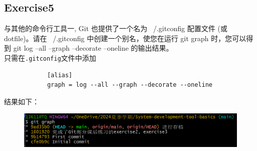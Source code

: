 \documentclass{article}
\begin{document}
        \subsection{Exercise5}
        与其他的命令行工具一, Git 也提供了一个名为 ~/.gitconfig 配置文件 
        (或 dotfile)。请在 ~/.gitconfig 中创建一个别名，使您在运行
         git graph 时，您可以得到 git log --all --graph --decorate --oneline 
         的输出结果。\\
         只需在\verb|.gitconfig|文件中添加
         \begin{verbatim}
            [alias]
            graph = log --all --graph --decorate --oneline
        \end{verbatim}
        结果如下：
        \begin{figure}[H]
            \centering
            \includegraphics[scale=0.8]{7.png}
        \end{figure}
\end{document}
